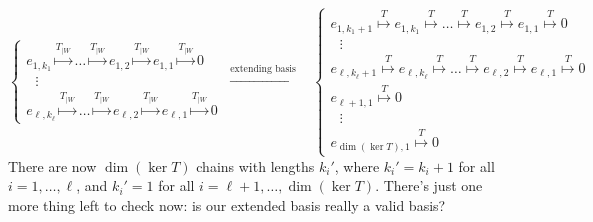 \[
\begin{cases}
e_{1, k_1} \stackrel{T_{|W}}{\mapsto} \dots \stackrel{T_{|W}}{\mapsto} e_{1, 2} \stackrel{T_{|W}}{\mapsto} e_{1, 1} \stackrel{T_{|W}}{\mapsto} 0 \\
~~~\vdots \\
e_{\ell, k_{\ell}} \stackrel{T_{|W}}{\mapsto} \dots \stackrel{T_{|W}}{\mapsto} e_{\ell, 2} \stackrel{T_{|W}}{\mapsto} e_{\ell, 1} \stackrel{T_{|W}}{\mapsto} 0
\end{cases} ~ \xrightarrow{\text{extending basis}} ~~~~
\begin{cases}
    e_{1, k_1 + 1} \stackrel{T}{\mapsto} e_{1, k_1} \stackrel{T}{\mapsto} \dots \stackrel{T}{\mapsto} e_{1, 2} \stackrel{T}{\mapsto} e_{1, 1} \stackrel{T}{\mapsto} 0 \\
    ~~~\vdots \\
    e_{\ell, k_{\ell} + 1} \stackrel{T}{\mapsto} e_{\ell, k_{\ell}} \stackrel{T}{\mapsto} \dots \stackrel{T}{\mapsto} e_{\ell, 2} \stackrel{T}{\mapsto} e_{\ell, 1} \stackrel{T}{\mapsto} 0 \\
    e_{\ell + 1, 1} \stackrel{T}{\mapsto} 0 \\
    ~~~ \vdots \\
    e_{\dim(\ker T), 1} \stackrel{T}{\mapsto} 0
\end{cases}
\]
There are now $\dim(\ker T)$ chains with lengths $k_i'$, where $k_i' = k_i + 1$ for all $i = 1, \dots, \ell$, and  $k_i' = 1$ for all $i = \ell + 1, \dots, \dim(\ker T)$.  There's just one more thing left to check now: is our extended basis really a valid basis?
